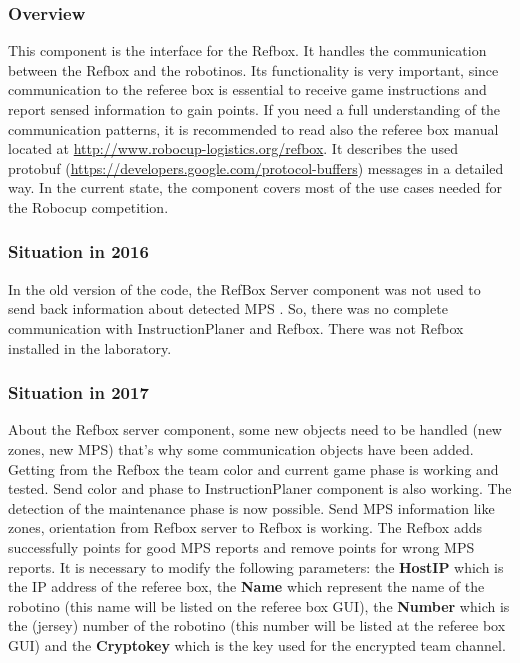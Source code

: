 
\subsubsection{Overview}

This component is the interface for the Refbox. It handles the communication between the Refbox and the robotinos. Its functionality is very important, since communication to the referee box is essential to receive game instructions and report sensed information to gain points. If you need a full understanding of the communication patterns, it is recommended to read also the referee box manual located at \url{ http://www.robocup-logistics.org/refbox}. It describes the used protobuf (\url{https://developers.google.com/protocol-buffers}) messages in a detailed way. In the current state, the component covers most of the use cases needed for the Robocup competition.


\subsubsection{Situation in 2016}

In the old version of the code, the RefBox Server component was not used to send back information about detected MPS \cite{BOK}. So, there was no complete communication with InstructionPlaner and Refbox. There was not Refbox installed in the laboratory. 


\subsubsection{Situation in 2017}

About the Refbox server component, some new objects need to be handled (new zones, new MPS) that's why some communication objects have been added. Getting from the Refbox the team color and current game phase is working and tested. Send color and phase to InstructionPlaner component is also working. The detection of the maintenance phase is now possible. Send MPS information like zones, orientation from Refbox server to Refbox is working. The Refbox adds successfully points for good MPS reports and remove points for wrong MPS reports. It is necessary to modify the following parameters: the \textbf{HostIP} which is the IP address of the referee box, the \textbf{Name} which represent the name of the robotino (this name will be listed on the referee box GUI), the \textbf{Number} which is the (jersey) number of the robotino (this number will be listed at the referee box GUI) and the \textbf{Cryptokey} which is the key used for the encrypted team channel.\\


